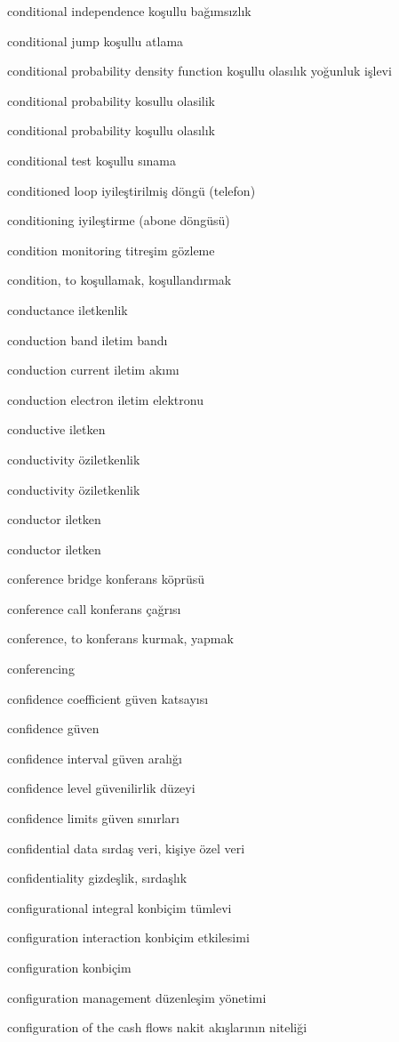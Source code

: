 \documentclass[12pt,fleqn]{article}\usepackage{../../common}
\begin{document}
conditional independence koşullu bağımsızlık

conditional jump koşullu atlama

conditional probability density function koşullu olasılık yoğunluk işlevi

conditional probability kosullu olasilik

conditional probability koşullu olasılık

conditional test koşullu sınama

conditioned loop iyileştirilmiş döngü (telefon)

conditioning iyileştirme (abone döngüsü)

condition monitoring titreşim gözleme

condition, to koşullamak, koşullandırmak

conductance iletkenlik

conduction band iletim bandı

conduction current iletim akımı

conduction electron iletim elektronu

conductive iletken

conductivity öziletkenlik

conductivity öziletkenlik

conductor iletken

conductor iletken

conference bridge konferans köprüsü

conference call konferans çağrısı

conference, to konferans kurmak, yapmak

conferencing

confidence coefficient güven katsayısı

confidence güven

confidence interval güven aralığı

confidence level güvenilirlik düzeyi

confidence limits güven sınırları

confidential data sırdaş veri, kişiye özel veri

confidentiality gizdeşlik, sırdaşlık

configurational integral konbiçim tümlevi

configuration interaction konbiçim etkilesimi

configuration konbiçim

configuration management düzenleşim yönetimi

configuration of the cash flows nakit akışlarının niteliği
\end{document}
